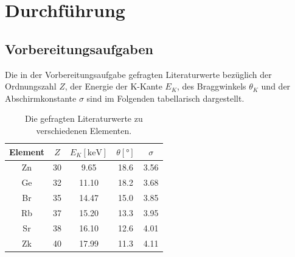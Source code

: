 \section{Durchführung}
\label{sec:Durchführung}
\subsection{Vorbereitungsaufgaben}
\label{sec:vorbereitung}
Die in der Vorbereitungsaufgabe gefragten Literaturwerte bezüglich der Ordnungszahl $Z$, der Energie der K-Kante $E_K$, des Braggwinkels
$\theta_K$ und der Abschirmkonstante $\sigma$ sind im Folgenden tabellarisch dargestellt.
\begin{table}[H]
    \centering
        \caption{Die gefragten Literaturwerte zu verschiedenen Elementen.\cite{AP05}}
        \label{tab:diss1}
        \begin{tabular}{S S[table-format=2.0] S[table-format=2.2] S[table-format=2.1] S}
          \toprule
          {Element} & {$Z$} & {$E_K [\si{\kilo\electronvolt}]$} & {$\theta [\si{\degree}]$} & {$\sigma$}\\
          \midrule
            {Zn} & 30 & 9.65  & 18.6 & 3.56 \\
            {Ge} & 32 & 11.10 & 18.2 & 3.68 \\
            {Br} & 35 & 14.47 & 15.0 & 3.85 \\
            {Rb} & 37 & 15.20 & 13.3 & 3.95 \\
            {Sr} & 38 & 16.10 & 12.6 & 4.01 \\
            {Zk} & 40 & 17.99 & 11.3 & 4.11 \\
          \bottomrule
        \end{tabular}
      \end{table}
